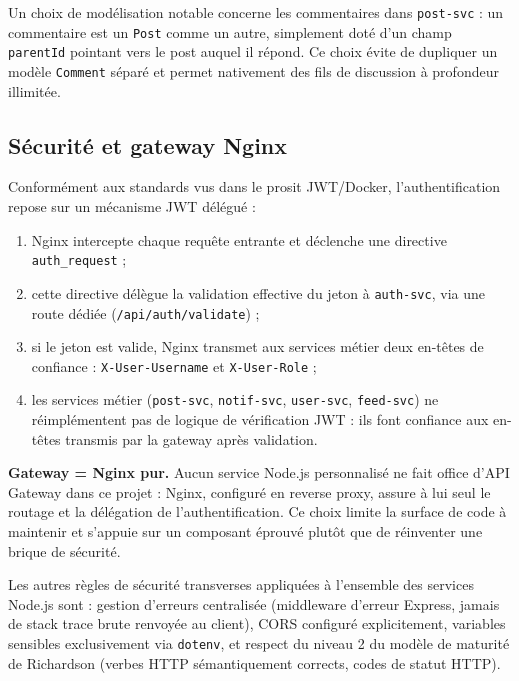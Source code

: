 \documentclass{cesi}
\begin{document}
Un choix de modélisation notable concerne les commentaires dans \texttt{post-svc} :
un commentaire est un \texttt{Post} comme un autre, simplement doté d'un
champ \texttt{parentId} pointant vers le post auquel il répond. Ce choix évite de
dupliquer un modèle \texttt{Comment} séparé et permet nativement des fils de
discussion à profondeur illimitée.

\subsection{Sécurité et gateway Nginx}

Conformément aux standards vus dans le prosit JWT/Docker, l'authentification
repose sur un mécanisme JWT délégué :

\begin{enumerate}
  \item Nginx intercepte chaque requête entrante et déclenche une directive
        \texttt{auth\_request} ;
  \item cette directive délègue la validation effective du jeton à
        \texttt{auth-svc}, via une route dédiée (\texttt{/api/auth/validate}) ;
  \item si le jeton est valide, Nginx transmet aux services métier deux en-têtes
        de confiance : \texttt{X-User-Username} et \texttt{X-User-Role} ;
  \item les services métier (\texttt{post-svc}, \texttt{notif-svc}, \texttt{user-svc},
        \texttt{feed-svc}) ne réimplémentent pas de logique de vérification JWT : ils
        font confiance aux en-têtes transmis par la gateway après validation.
\end{enumerate}

\begin{infobox}
\textbf{Gateway = Nginx pur.} Aucun service Node.js personnalisé ne fait office
d'API Gateway dans ce projet : Nginx, configuré en reverse proxy, assure à lui seul
le routage et la délégation de l'authentification. Ce choix limite la surface de
code à maintenir et s'appuie sur un composant éprouvé plutôt que de réinventer une
brique de sécurité.
\end{infobox}

Les autres règles de sécurité transverses appliquées à l'ensemble des services
Node.js sont : gestion d'erreurs centralisée (middleware d'erreur Express, jamais
de stack trace brute renvoyée au client), CORS configuré explicitement, variables
sensibles exclusivement via \texttt{dotenv}, et respect du niveau 2 du modèle de
maturité de Richardson (verbes HTTP sémantiquement corrects, codes de statut HTTP).
\end{document}
